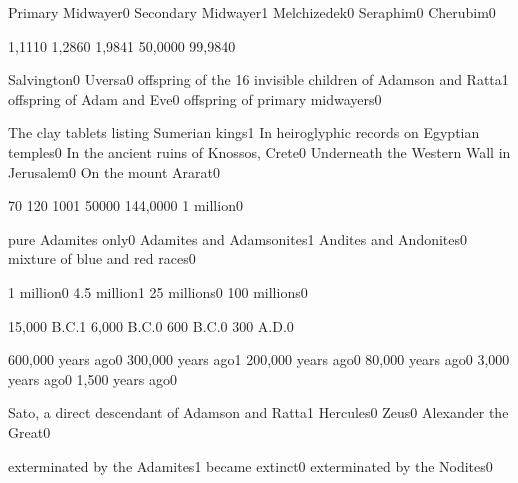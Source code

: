 {Primary Midwayer}{0}
{Secondary Midwayer}{1}
{Melchizedek}{0}
{Seraphim}{0}
{Cherubim}{0}
\qstop

{1,111}{0}
{1,286}{0}
{1,984}{1}
{50,000}{0}
{99,984}{0}
\qstop

{Salvington}{0}
{Uversa}{0}
{offspring of the 16 invisible children of Adamson and Ratta}{1}
{offspring of Adam and Eve}{0}
{offspring of primary midwayers}{0}
\qstop

{The clay tablets listing Sumerian kings}{1}
{In heiroglyphic records on Egyptian temples}{0}
{In the ancient ruins of Knossos, Crete}{0}
{Underneath the Western Wall in Jerusalem}{0}
{On the mount Ararat}{0}
\qstop

{7}{0}
{12}{0}
{100}{1}
{5000}{0}
{144,000}{0}
{1 million}{0}
\qstop


{pure Adamites only}{0}
{Adamites and Adamsonites}{1}
{Andites and Andonites}{0}
{mixture of blue and red races}{0}
\qstop

{1 million}{0}
{4.5 million}{1}
{25 millions}{0}
{100 millions}{0}
\qstop

{15,000 B.C.}{1}
{6,000 B.C.}{0}
{600 B.C.}{0}
{300 A.D.}{0}
\qstop


{600,000 years ago}{0}
{300,000 years ago}{1}
{200,000 years ago}{0}
{80,000 years ago}{0}
{3,000 years ago}{0}
{1,500 years ago}{0}
\qstop


{Sato, a direct descendant of Adamson and Ratta}{1}
{Hercules}{0}
{Zeus}{0}
{Alexander the Great}{0}
\qstop

{exterminated by the Adamites}{1}
{became extinct}{0}
{exterminated by the Nodites}{0}
\qstop

